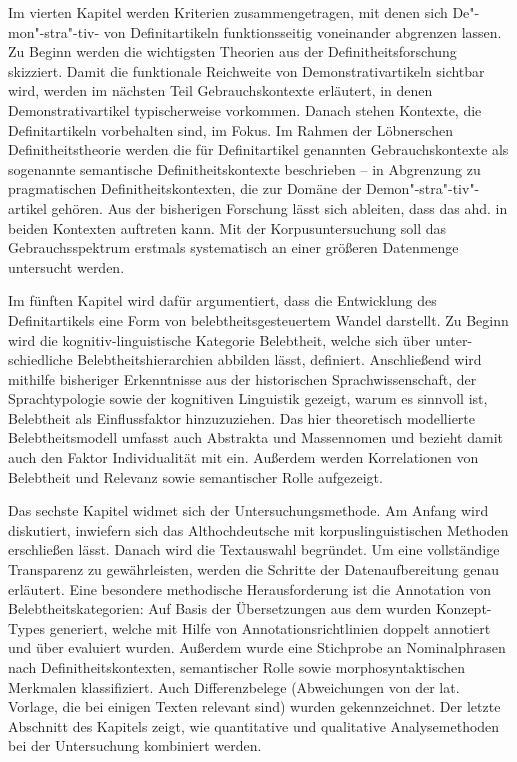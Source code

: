 Im vierten Kapitel werden Kriterien zusammengetragen, mit denen sich De"-mon"-stra"-tiv- von Definitartikeln funktionsseitig voneinander abgrenzen lassen. Zu Beginn werden die wichtigsten Theorien aus der Definitheitsforschung  skizziert. Damit die funktionale Reichweite von Demonstrativartikeln sichtbar wird, werden im nächsten Teil Gebrauchskontexte erläutert, in denen Demonstrativartikel typischerweise vorkommen. Danach stehen Kontexte, die  Definitartikeln vorbehalten sind, im Fokus. 
Im Rahmen der Löbnerschen Definitheitstheorie \parencite{Lobner1985}  werden die für Definitartikel genannten Gebrauchskontexte als sogenannte semantische Definitheitskontexte beschrieben -- in Abgrenzung zu  pragmatischen Definitheitskontexten, die zur Domäne der Demon"-stra"-tiv"-artikel gehören. Aus der bisherigen Forschung lässt sich ableiten, dass das ahd.  in beiden Kontexten auftreten kann. Mit der Korpusuntersuchung soll das Gebrauchsspektrum erstmals systematisch an einer größeren Datenmenge untersucht werden. 

Im fünften Kapitel wird dafür argumentiert, dass die Entwicklung des Definitartikels eine Form von belebtheitsgesteuertem Wandel darstellt. Zu Beginn wird die kognitiv-linguistische Kategorie Belebtheit, welche sich über unter-\linebreak schiedliche Belebtheitshierarchien abbilden lässt, definiert. Anschließend wird mithilfe bisheriger Erkenntnisse aus der historischen Sprachwissenschaft, der Sprachtypologie sowie der kognitiven Linguistik gezeigt, warum es sinnvoll ist, Belebtheit als Einflussfaktor hinzuzuziehen. Das hier theoretisch modellierte Belebtheitsmodell umfasst auch Abstrakta und Massennomen und bezieht damit auch den Faktor Individualität mit ein. Außerdem werden Korrelationen von Belebtheit und Relevanz sowie semantischer Rolle aufgezeigt.

Das sechste Kapitel widmet sich der Untersuchungsmethode. Am Anfang wird diskutiert, inwiefern sich das Althochdeutsche mit korpuslinguistischen Methoden erschließen lässt. Danach wird die Textauswahl begründet. Um eine vollständige Transparenz zu gewährleisten, werden die Schritte der Datenaufbereitung genau erläutert. Eine besondere methodische Herausforderung ist die Annotation von Belebtheitskategorien: Auf Basis der Übersetzungen aus dem  wurden Konzept-Types generiert, welche mit Hilfe von Annotationsrichtlinien doppelt annotiert und über   evaluiert wurden. Außerdem wurde eine Stichprobe an Nominalphrasen nach Definitheitskontexten, semantischer Rolle sowie morphosyntaktischen Merkmalen klassifiziert. Auch Differenzbelege (Abweichungen von der lat. Vorlage, die bei einigen Texten relevant sind) wurden gekennzeichnet. Der letzte Abschnitt des Kapitels zeigt, wie quantitative und qualitative Analysemethoden bei der Untersuchung kombiniert werden. 
  
